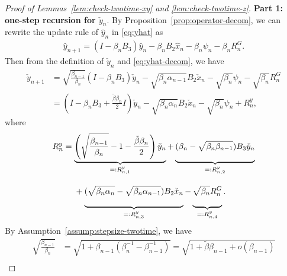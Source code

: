 \documentclass[11pt]{article}
\theoremstyle{plain}
\theoremstyle{definition}
\def\invdiffslow{\tilde{\beta}}
\def\mI{{\bm{I}}}
\newcommand{\xhat}{{\hat{x}}}
\newcommand{\yhat}{{\hat{y}}}
\newcommand{\xcheck}{{\check{x}}}
\newcommand{\ycheck}{{\check{y}}}
\def\mI{{I}}
\begin{document}
\begin{appendix}
\begin{proof}[Proof of Lemmas~\ref{lem:check-twotime-xy} and \ref{lem:check-twotime-z}]
\textbf{Part 1: one-step recursion for $\ycheck_{n}$}.
By Proposition~\ref{prop:operator-decom}, we can rewrite the update rule of $\yhat_{n}$ in \eqref{eq:yhat} as 
\begin{align}
    \label{eq:yhat-decom}
    \yhat_{n+1} = (I - \beta_{n} B_3) \yhat_{n} - \beta_{n} B_2 \xhat_{n} - \beta_n \psi_n - \beta_n R_n^G.
\end{align}
Then from the definition of $\ycheck_{n}$ and \eqref{eq:yhat-decom}, we have 
\begin{align}
    \ycheck_{n+1}
    & = \sqrt{ \frac{ \beta_{n-1} }{ \beta_{n} } } (\mI - \beta_{n} B_3) \ycheck_{n} - \sqrt{ \beta_{n} \alpha_{n-1} } B_2 \xcheck_{n} - \sqrt{\beta_{n}} \psi_{n} - \sqrt{\beta_{n}} R_{n}^G \nonumber \\
    & = \left( \mI - \beta_{n} B_3 + \frac{ \invdiffslow \beta_{n} }{2} \mI \right) \ycheck_{n} - \sqrt{\beta_{n} \alpha_{n} } B_2 \xcheck_{n} - \sqrt{\beta_n} \psi_{n} + R_{n}^y, \label{eq:lem:check-twotime:y-update}
\end{align}
where
\begin{align}\label{eq:lem:check-twotime:Ry}
    \begin{split}
        R_{n}^y
        & =  \underbrace{ \left( \sqrt{ \frac{ \beta_{n-1} }{\beta_{n}} } - 1 - \frac{ \invdiffslow \beta_{n} }{2} \right) \ycheck_{n} }_{=: R_{n,1}^y}  
        + \underbrace{ ( \beta_{n} - \sqrt{ \beta_{n} \beta_{n-1} } ) B_3 \ycheck_{n} 
            \vphantom{ \left( \sqrt{ \frac{ \beta_{n-1} }{\beta_{n}} } \right) } }_{ =:R_{n,2}^y } \\
        & \quad \  + \underbrace{
            ( \sqrt{ 
                \beta_{n} 
                \alpha_{n} } - \sqrt{ 
                \beta_{n} 
                \alpha_{n-1} } ) B_2 \xcheck_{n}
            \vphantom{ \left( \sqrt{ \frac{ \beta_{n-1} }{\beta_{n}} } \right) } }_{=: R_{n,3}^y } 
        - \underbrace{ \sqrt{\beta_{n}} R_{n}^G 
            \vphantom{ \left( \sqrt{ \frac{ \beta_{n-1} }{\beta_{n}} } \right) } }_{ =: R_{n,4}^y }.
    \end{split}
\end{align}
By Assumption~\ref{assump:stepsize-twotime}, we have
\begin{align}
        \sqrt{ \frac{ \beta_{n-1} }{ \beta_{n} } } 
        & = \sqrt{ 1 + \beta_{n-1} ( \beta_{n}^{-1} - \beta_{n-1}^{-1} ) } = \sqrt{1 + \invdiffslow \beta_{n-1}  + o(\beta_{n-1}) } \nonumber \\

\end{align}
\end{proof}
\end{appendix}
\end{document}
